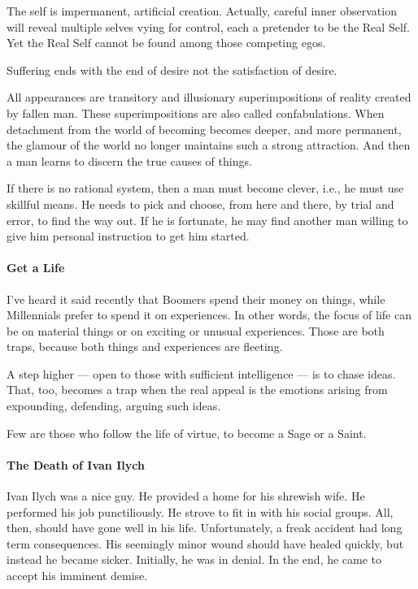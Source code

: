 The self is impermanent, artificial creation. Actually, careful inner observation will reveal multiple selves vying for control, each a pretender to be the Real Self. Yet the Real Self cannot be found among those competing egos.

Suffering ends with the end of desire not the satisfaction of desire.

All appearances are transitory and illusionary superimpositions of reality created by fallen man. These superimpositions are also called confabulations. When detachment from the world of becoming becomes deeper, and more permanent, the glamour of the world no longer maintains such a strong attraction. And then a man learns to discern the true causes of things.

If there is no rational system, then a man must become clever, i.e., he must use skillful means. He needs to pick and choose, from here and there, by trial and error, to find the way out. If he is fortunate, he may find another man willing to give him personal instruction to get him started.

\paragraph{Get a Life}
I've heard it said recently that Boomers spend their money on things, while Millennials prefer to spend it on experiences. In other words, the focus of life can be on material things or on exciting or unusual experiences. Those are both traps, because both things and experiences are fleeting.

A step higher — open to those with sufficient intelligence — is to chase ideas. That, too, becomes a trap when the real appeal is the emotions arising from expounding, defending, arguing such ideas.

Few are those who follow the life of virtue, to become a Sage or a Saint.

\paragraph{The Death of Ivan Ilych}
Ivan Ilych was a nice guy. He provided a home for his shrewish wife. He performed his job punctiliously. He strove to fit in with his social groups. All, then, should have gone well in his life. Unfortunately, a freak accident had long term consequences. His seemingly minor wound should have healed quickly, but instead he became sicker. Initially, he was in denial. In the end, he came to accept his imminent demise.

